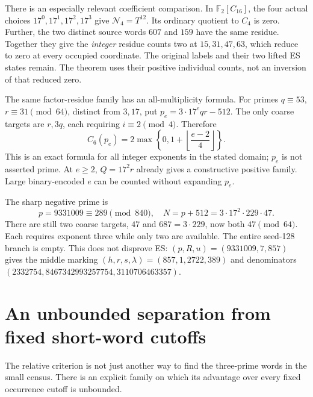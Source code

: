 There is an especially relevant coefficient comparison. In
$\mathbb F_2[C_{16}]$, the four actual choices $17^0,17^1,17^2,17^3$
give $\mathcal N_4=T^{12}$. Its ordinary quotient to $C_4$ is zero.
Further, the two distinct source words $607$ and $159$ have the same residue.
Together they give the \emph{integer} residue counts two at $15,31,47,63$,
which reduce to zero at every occupied coordinate. The original labels and
their two lifted ES states remain. The theorem uses their positive individual
counts, not an inversion of that reduced zero.

The same factor-residue family has an all-multiplicity formula. For primes
$q\equiv53$, $r\equiv31\pmod{64}$, distinct from $3,17$, put
$p_e=3\cdot17^e qr-512$. The only coarse targets are $r,3q$, each requiring
$i\equiv2\pmod4$. Therefore
\[
 \boxed{C_6(p_e)=2\max\left\{0,1+\left\lfloor\frac{e-2}{4}\right\rfloor\right\}.}
 \tag{E4}
\]
This is an exact formula for all integer exponents in the stated domain;
$p_e$ is not asserted prime. At $e\ge2$, $Q=17^2r$ already gives a constructive
positive family. Large binary-encoded $e$ can be counted without expanding $p_e$.

The sharp negative prime is
\[
 \boxed{p=9331009\equiv289\pmod{840},\quad
 N=p+512=3\cdot17^2\cdot229\cdot47.}                        \tag{E5}
\]
There are still two coarse targets, $47$ and $687=3\cdot229$, now both
$47\pmod{64}$. Each requires exponent three while only two are available.
The entire seed-128 branch is empty. This does not disprove ES:
$(p,R,u)=(9331009,7,857)$ gives the middle marking
$(h,r,s,\lambda)=(857,1,2722,389)$ and denominators
$(2332754,8467342993257754,3110706463357)$.

\section{An unbounded separation from fixed short-word cutoffs}
The relative criterion is not just another way to find the three-prime words
in the small census. There is an explicit family on which its advantage over
every fixed occurrence cutoff is unbounded.

